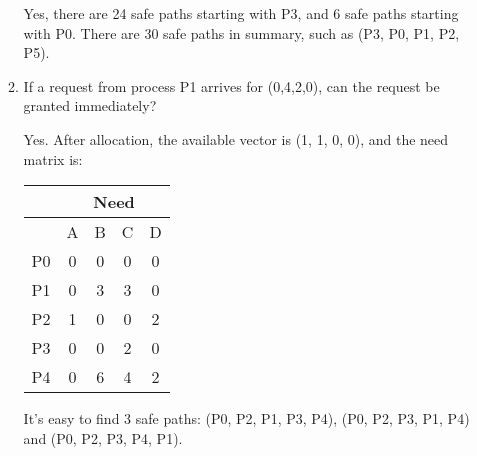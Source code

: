 \begin{enumerate}
\begin{enumerate}
        Yes, there are 24 safe paths starting with P3, and 6 safe paths starting with P0. There are 30 safe paths in summary, such as (P3, P0, P1, P2, P5).
        
        \item If a request from process P1 arrives for (0,4,2,0), can the request be granted immediately?
        
        Yes. After allocation, the available vector is (1, 1, 0, 0), and the need matrix is:
        
        \begin{center}
            \begin{tabular}{|c|c|c|c|c|}
                \hline
                   & \multicolumn{4}{|c|}{Need} \\
                \hline
                   & A & B & C & D \\
                \hline
                P0 & 0 & 0 & 0 & 0 \\
                \hline
                P1 & 0 & 3 & 3 & 0 \\
                \hline
                P2 & 1 & 0 & 0 & 2 \\
                \hline
                P3 & 0 & 0 & 2 & 0 \\
                \hline
                P4 & 0 & 6 & 4 & 2 \\
                \hline
            \end{tabular}
        \end{center}

        It's easy to find 3 safe paths: (P0, P2, P1, P3, P4), (P0, P2, P3, P1, P4) and (P0, P2, P3, P4, P1).
        
    \end{enumerate}

\end{enumerate}
